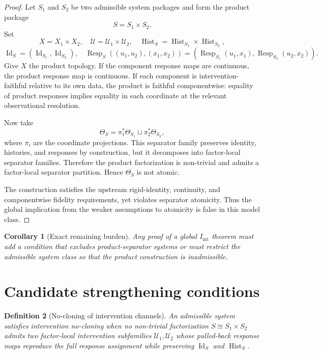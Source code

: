 \documentclass[11pt]{article}
\newtheorem{definition}{Definition}[section]
\newtheorem{corollary}[definition]{Corollary}
\newcommand{\Id}{\operatorname{Id}}
\newcommand{\Hist}{\operatorname{Hist}}
\newcommand{\Resp}{\operatorname{Resp}}
\begin{document}
\begin{proof}
Let $S_1$ and $S_2$ be two admissible system packages and form the product package
\[
  S = S_1\times S_2.
\]
Set
\[
  X=X_1\times X_2,
  \quad
  \mathcal U=\mathcal U_1\times\mathcal U_2,
  \quad
  \Hist_S=\Hist_{S_1}\times\Hist_{S_2},
\]
\[
  \Id_S=(\Id_{S_1},\Id_{S_2}),
  \quad
  \Resp_S((u_1,u_2),(x_1,x_2))=(\Resp_{S_1}(u_1,x_1),\Resp_{S_2}(u_2,x_2)).
\]
Give $X$ the product topology. If the component response maps are continuous, the product response map is continuous. If each component is intervention-faithful relative to its own data, the product is faithful componentwise: equality of product responses implies equality in each coordinate at the relevant observational resolution.

Now take
\[
  \Theta_S = \pi_1^*\Theta_{S_1}\sqcup \pi_2^*\Theta_{S_2},
\]
where $\pi_i$ are the coordinate projections. This separator family preserves identity, histories, and responses by construction, but it decomposes into factor-local separator families. Therefore the product factorization is non-trivial and admits a factor-local separator partition. Hence $\Theta_S$ is not atomic.

The construction satisfies the upstream rigid-identity, continuity, and componentwise fidelity requirements, yet violates separator atomicity. Thus the global implication from the weaker assumptions to atomicity is false in this model class.
\end{proof}

\begin{corollary}[Exact remaining burden]
Any proof of a global $I_{\mathrm{int}}$ theorem must add a condition that excludes product-separator systems or must restrict the admissible system class so that the product construction is inadmissible.
\end{corollary}

\section{Candidate strengthening conditions}

\begin{definition}[No-cloning of intervention channels]
An admissible system satisfies intervention no-cloning when no non-trivial factorization $S\cong S_1\times S_2$ admits two factor-local intervention subfamilies $\mathcal U_1,\mathcal U_2$ whose pulled-back response maps reproduce the full response assignment while preserving $\Id_S$ and $\Hist_S$.
\end{definition}
\end{document}
